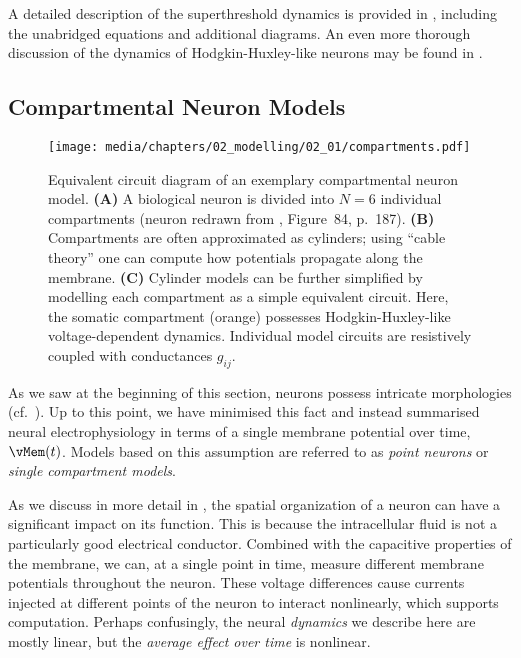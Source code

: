 A detailed description of the superthreshold dynamics is provided in , including the unabridged equations and additional diagrams.
An even more thorough discussion of the dynamics of Hodgkin-Huxley-like neurons may be found in \citet{izhikevich2007dynamical}.

\subsection{Compartmental Neuron Models}
\label{sec:comp}

\begin{figure}
	\centering
	\texttt{[image: media/chapters/02\_modelling/02\_01/compartments.pdf]}
	{\label{fig:compartments_physical}}%
	{\label{fig:compartments_volumes}}%
	{\label{fig:compartments_circuit}}%
	\caption[Equivalent circuit of an exemplary compartmental neuron model]{Equivalent circuit diagram of an exemplary compartmental neuron model. \textbf{(A)} A biological neuron is divided into $N = 6$ individual compartments (neuron redrawn from \cite{howell1916textbook}, Figure~84, p.~187).
	\textbf{(B)} Compartments are often approximated as cylinders; using \enquote{cable theory} one can compute how potentials propagate along the membrane.
	\textbf{(C)} Cylinder models can be further simplified by modelling each compartment as a simple equivalent circuit. Here, the somatic compartment (orange) possesses Hodgkin-Huxley-like voltage-dependent dynamics. Individual model circuits are resistively coupled with conductances $g_{ij}$.
	}
	\label{fig:compartments}
\end{figure}

As we saw at the beginning of this section, neurons possess intricate morphologies (cf.~).
Up to this point, we have minimised this fact and instead summarised neural electrophysiology in terms of a single membrane potential over time, $\vMem(t)$.
Models based on this assumption are referred to as \emph{point neurons} or \emph{single compartment models}.

As we discuss in more detail in , the spatial organization of a neuron can have a significant impact on its function.
This is because the intracellular fluid is not a particularly good electrical conductor.
Combined with the capacitive properties of the membrane, we can, at a single point in time, measure different membrane potentials throughout the neuron.
These voltage differences cause currents injected at different points of the neuron to interact nonlinearly, which supports computation.
Perhaps confusingly, the neural \emph{dynamics} we describe here are mostly linear, but the \emph{average effect over time} is nonlinear.

